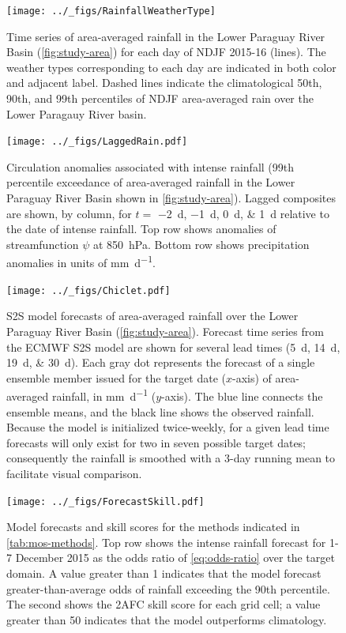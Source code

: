 \documentclass{ametsoc}
\begin{document}
\begin{figure}
	\noindent\texttt{[image: ../\_figs/RainfallWeatherType]}
	\caption{
		Time series of area-averaged rainfall in the Lower Paraguay River Basin (\cref{fig:study-area}) for each day of NDJF  2015-16 (lines).
		The weather types corresponding to each day are indicated in both color and adjacent label.
		Dashed lines indicate the climatological 50th, 90th, and 99th percentiles of NDJF area-averaged rain over the Lower Paragauy River basin.
	}
  \label{fig:rain-wt}
\end{figure}

\begin{figure}	\noindent\texttt{[image: ../\_figs/LaggedRain.pdf]}
	\caption{
		Circulation anomalies associated with intense rainfall (99th percentile exceedance of area-averaged rainfall in the Lower Paraguay River Basin shown in \cref{fig:study-area}).
		Lagged composites are shown, by column, for $t = $ \SIlist{-2;-1;0;1}{\day} relative to the date of intense rainfall.
		Top row shows anomalies of streamfunction $\psi$ at \SI{850}{\hecto\pascal}.
    Bottom row shows precipitation anomalies in units of \si{\milli\meter\per\day}.
	}
  \label{fig:lagged-rain}
\end{figure}

\begin{figure}
	\noindent\texttt{[image: ../\_figs/Chiclet.pdf]}
	\caption{
    S2S model forecasts of area-averaged rainfall over the Lower Paraguay River Basin (\cref{fig:study-area}).
    Forecast time series from the ECMWF S2S model are shown for several lead times (\SIlist{5;14;19;30}{\day}).
		Each gray dot represents the forecast of a single ensemble member issued for the target date ($x$-axis) of area-averaged rainfall, in \si{\milli\meter\per\day} ($y$-axis).
		The blue line connects the ensemble means, and the black line shows the observed rainfall.
		Because the model is initialized twice-weekly, for a given lead time forecasts will only exist for two in seven possible target dates;  consequently the rainfall is smoothed with a 3-day running mean to facilitate visual comparison.
	}
  \label{fig:chiclet}
\end{figure}

\begin{figure}
	\noindent\texttt{[image: ../\_figs/ForecastSkill.pdf]}
	\caption{
		Model forecasts and skill scores for the methods indicated in \cref{tab:mos-methods}.
		Top row shows the intense rainfall forecast for 1-7 December 2015 as the odds ratio of \cref{eq:odds-ratio} over the target domain.
		A value greater than 1 indicates that the model forecast greater-than-average odds of rainfall exceeding the 90th percentile.
		The second shows the 2AFC skill score for each grid cell; a value greater than 50 indicates that the model outperforms climatology.
	}
  \label{fig:subsprobfcst}
\end{figure}
\end{document}
